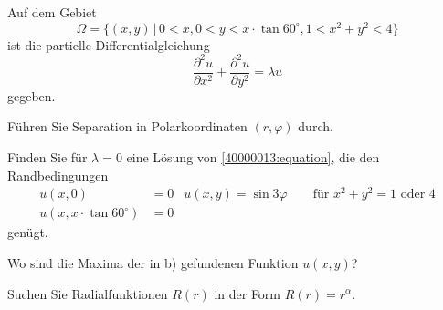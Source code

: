 Auf dem Gebiet 
\[
\Omega = \{(x,y)\,|\, 0<x, 0 < y < x\cdot \tan 60^\circ, 1 < x^2 +y^2 < 4\}
\]
ist die partielle Differentialgleichung
\begin{equation}
\frac{\partial^2u}{\partial x^2}
+
\frac{\partial^2u}{\partial y^2}
=
\lambda u
\label{40000013:equation}
\end{equation}
gegeben.
\begin{teilaufgaben}
\item
Führen Sie Separation in Polarkoordinaten $(r,\varphi)$ durch.
\item
Finden Sie für $\lambda=0$ eine Lösung von \eqref{40000013:equation}, die
den Randbedingungen
\begin{align*}
u(x,0)&=0&u(x,y)=\sin3\varphi\qquad \text{für $x^2+y^2=1$ oder $4$}\\
u(x,x\cdot \tan 60^\circ)&=0
\end{align*}
genügt.
\item
Wo sind die Maxima der in b) gefundenen Funktion $u(x,y)$?
\end{teilaufgaben}

\begin{hinweis}
Suchen Sie Radialfunktionen $R(r)$ in der Form $R(r)=r^\alpha$.
\end{hinweis}

